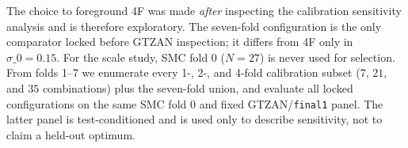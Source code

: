 \documentclass{article}
\begin{document}
The choice to foreground 4F was made \emph{after} inspecting the calibration sensitivity analysis and is therefore exploratory. The seven-fold configuration is the only comparator locked before GTZAN inspection; it differs from 4F only in $\sigma\_0=0.15$. For the scale study, SMC fold 0 ($N=27$) is never used for selection. From folds 1--7 we enumerate every 1-, 2-, and 4-fold calibration subset ($7$, $21$, and $35$ combinations) plus the seven-fold union, and evaluate all locked configurations on the same SMC fold 0 and fixed GTZAN/\texttt{final1} panel. The latter panel is test-conditioned and is used only to describe sensitivity, not to claim a held-out optimum. 









\end{document}
